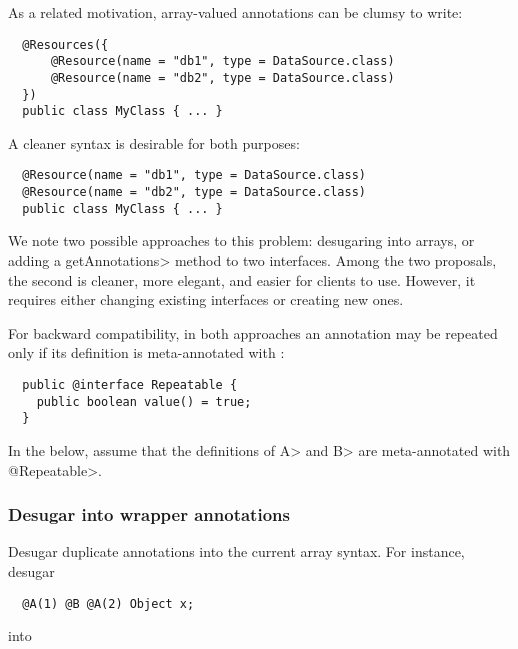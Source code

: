 \documentclass[10pt]{article}
\begin{document}
As a related motivation, array-valued annotations can be clumsy to write:

\begin{Verbatim}
  @Resources({
      @Resource(name = "db1", type = DataSource.class)
      @Resource(name = "db2", type = DataSource.class)
  })
  public class MyClass { ... }
\end{Verbatim}

A cleaner syntax is desirable for both purposes:

\begin{Verbatim}
  @Resource(name = "db1", type = DataSource.class)
  @Resource(name = "db2", type = DataSource.class)
  public class MyClass { ... }
\end{Verbatim}

We note two possible approaches to this problem:  desugaring into arrays,
or adding a \<getAnnotations> method to two interfaces.
Among the two proposals, the second is cleaner, more elegant, and easier
for clients to use.  However, it requires either changing existing
interfaces or creating new ones.

For backward compatibility, in both approaches an annotation may be
repeated only if its definition is meta-annotated with :

\begin{Verbatim} 
  public @interface Repeatable {
    public boolean value() = true;
  }
\end{Verbatim}

\noindent
In the below, assume that the definitions of \<A> and \<B> are
meta-annotated with \<@Repeatable>.



\subsubsection{Desugar into wrapper annotations}

Desugar duplicate annotations into
the current array syntax.  For instance, desugar

\begin{Verbatim}
  @A(1) @B @A(2) Object x;
\end{Verbatim}

\noindent
into
\end{document}
